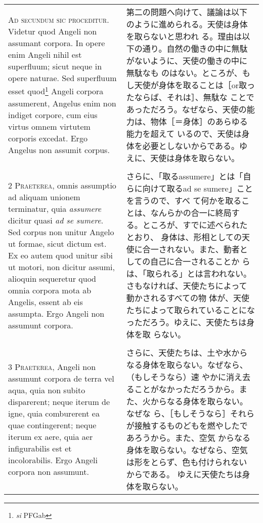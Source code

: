 \documentclass[10pt]{jsarticle} %
\begin{document}
\begin{longtable}{p{21em}p{21em}}

{\huge A}{\scshape d secundum sic proceditur}. Videtur quod
Angeli non assumant corpora. In opere enim Angeli nihil est superfluum;
sicut neque in opere naturae. Sed superfluum esset
 quod\footnote{{\itshape si} PFGab} Angeli corpora
assumerent, Angelus enim non indiget corpore, cum eius virtus omnem
virtutem corporis excedat. Ergo Angelus non assumit corpus.

&

 第二の問題へ向けて、議論は以下のように進められる。天使は身体を取らないと思われ
る。理由は以下の通り。自然の働きの中に無駄がないように、天使の働きの中に無駄なも
のはない。ところが、もし天使が身体を取ることは［or取ったならば、それは］、無駄な
ことであっただろう。なぜなら、天使の能力は、物体［＝身体］のあらゆる能力を超えて
いるので、天使は身体を必要としないからである。ゆえに、天使は身体を取らない。

\\\\

{\scshape 2 Praeterea}, omnis assumptio ad aliquam unionem terminatur,
quia {\itshape assumere} dicitur quasi {\itshape ad se sumere}. Sed
corpus non unitur Angelo ut formae, sicut dictum est. Ex eo autem quod
unitur sibi ut motori, non dicitur assumi, alioquin sequeretur quod
omnia corpora mota ab Angelis, essent ab eis assumpta. Ergo Angeli non
assumunt corpora.

&

さらに、「取るassumere」とは「自らに向けて取るad se sumere」ことを言うので、すべ
て何かを取ることは、なんらかの合一に終局する。ところが、すでに述べられたとおり、
身体は、形相としての天使に合一されない。また、動者としての自己に合一されることか
らは、「取られる」とは言われない。さもなければ、天使たちによって動かされるすべての物
体が、天使たちによって取られていることになっただろう。ゆえに、天使たちは身体を取
らない。

\\\\


{\scshape 3 Praeterea}, Angeli non assumunt corpora de terra vel aqua, quia non
subito disparerent; neque iterum de igne, quia comburerent ea quae contingerent;
neque iterum ex aere, quia aer infigurabilis est et incolorabilis. Ergo Angeli
corpora non assumunt.

&


 さらに、天使たちは、土や水からなる身体を取らない。なぜなら、（もしそうなら）速
 やかに消え去ることがなかっただろうから。また、火からなる身体を取らない。なぜな
 ら、［もしそうなら］それらが接触するものどもを燃やしたであろうから。また、空気
 からなる身体を取らない。なぜなら、空気は形をとらず、色も付けられないからである。
 ゆえに天使たちは身体を取らない。


\end{longtable}
\end{document}
